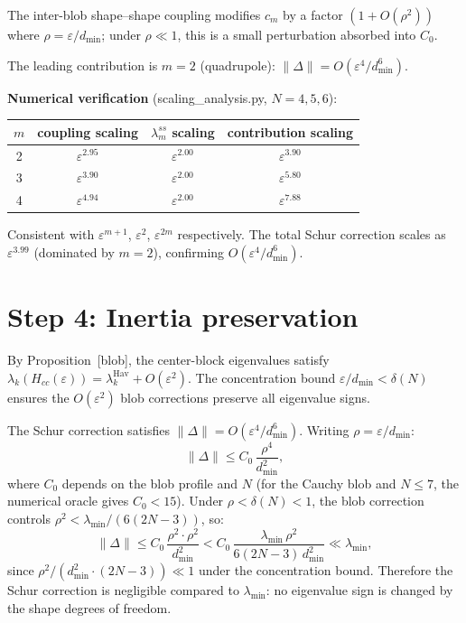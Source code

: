 \documentclass[11pt]{article}
\begin{document}
The inter-blob shape--shape coupling modifies $c_m$ by a factor
$(1 + O(\rho^2))$ where $\rho = \varepsilon/d_{\min}$; under
$\rho \ll 1$, this is a small perturbation absorbed into $C_0$.

The leading contribution is $m = 2$ (quadrupole):
$\|\Delta\| = O(\varepsilon^4/d_{\min}^6)$.

\textbf{Numerical verification} (scaling\_analysis.py, $N = 4, 5, 6$):
\begin{center}
\begin{tabular}{cccc}
  $m$ & coupling scaling & $\lambda_m^{ss}$ scaling & contribution scaling \\
  \hline
  2 & $\varepsilon^{2.95}$ & $\varepsilon^{2.00}$ & $\varepsilon^{3.90}$ \\
  3 & $\varepsilon^{3.90}$ & $\varepsilon^{2.00}$ & $\varepsilon^{5.80}$ \\
  4 & $\varepsilon^{4.94}$ & $\varepsilon^{2.00}$ & $\varepsilon^{7.88}$ \\
\end{tabular}
\end{center}
Consistent with $\varepsilon^{m+1}$, $\varepsilon^2$, $\varepsilon^{2m}$
respectively.  The total Schur correction scales as $\varepsilon^{3.99}$
(dominated by $m = 2$), confirming $O(\varepsilon^4/d_{\min}^6)$.

\section{Step 4: Inertia preservation}

By Proposition~[blob], the center-block eigenvalues satisfy
$\lambda_k(H_{cc}(\varepsilon)) = \lambda_k^{\mathrm{Hav}} + O(\varepsilon^2)$.
The concentration bound $\varepsilon/d_{\min} < \delta(N)$
ensures the $O(\varepsilon^2)$ blob corrections preserve all
eigenvalue signs.

The Schur correction satisfies $\|\Delta\| = O(\varepsilon^4/d_{\min}^6)$.
Writing $\rho = \varepsilon/d_{\min}$:
\[
  \|\Delta\| \le C_0\,\frac{\rho^4}{d_{\min}^2},
\]
where $C_0$ depends on the blob profile and $N$ (for the Cauchy
blob and $N \le 7$, the numerical oracle gives $C_0 < 15$).
Under $\rho < \delta(N) < 1$,
the blob correction controls
$\rho^2 < \lambda_{\min}/(6(2N{-}3))$, so:
\[
  \|\Delta\| \le C_0\,\frac{\rho^2 \cdot \rho^2}{d_{\min}^2}
  < C_0\,\frac{\lambda_{\min}\,\rho^2}{6(2N{-}3)\,d_{\min}^2}
  \ll \lambda_{\min},
\]
since $\rho^2/(d_{\min}^2 \cdot (2N{-}3)) \ll 1$ under the
concentration bound.  Therefore the Schur correction is
negligible compared to $\lambda_{\min}$: no eigenvalue sign is
changed by the shape degrees of freedom.
\end{document}
